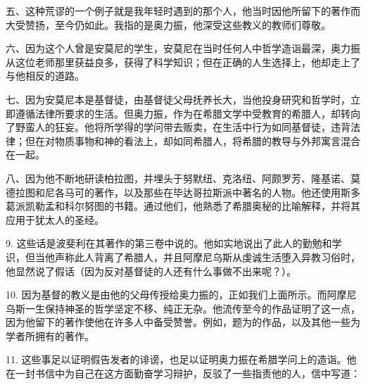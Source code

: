 五、这种荒谬的一个例子就是我年轻时遇到的那个人，他当时因他所留下的著作而大受赞扬，至今仍如此。我指的是奥力振，他深受这些教义的教师们尊敬。\par

六、因为这个人曾是安莫尼的学生，安莫尼在当时任何人中哲学造诣最深，奥力振从这位老师那里获益良多，获得了科学知识；但在正确的人生选择上，他却走上了与他相反的道路。\par

七、因为安莫尼本是基督徒，由基督徒父母抚养长大，当他投身研究和哲学时，立即遵循法律所要求的生活。但奥力振，作为在希腊文学中受教育的希腊人，却转向了野蛮人的狂妄。他将所学得的学问带去贩卖，在生活中行为如同基督徒，违背法律；但在对物质事物和神的看法上，却如同希腊人，将希腊的教导与外邦寓言混合在一起。\par

八、因为他不断地研读柏拉图，并埋头于努默纽、克洛纽、阿颇罗芳、隆基诺、莫德拉图和尼各马可的著作，以及那些在毕达哥拉斯派中著名的人物。他还使用斯多葛派凯勒孟和科尔努图的书籍。通过他们，他熟悉了希腊奥秘的比喻解释，并将其应用于犹太人的圣经。\par

9. 这些话是波斐利在其著作的第三卷中说的。他如实地说出了此人的勤勉和学识，但当他声称此人背离了希腊人，并且阿摩尼乌斯从虔诚生活堕入异教习俗时，他显然说了假话（因为反对基督徒的人还有什么事做不出来呢？）。\par

10. 因为基督的教义是由他的父母传授给奥力振的，正如我们上面所示。而阿摩尼乌斯一生保持神圣的哲学坚定不移、纯正无杂。他流传至今的作品证明了这一点，因为他留下的著作使他在许多人中备受赞誉。例如，题为的作品，以及其他一些为学者所拥有的著作。\par

11. 这些事足以证明假告发者的诽谤，也足以证明奥力振在希腊学问上的造诣。他在一封书信中为自己在这方面勤奋学习辩护，反驳了一些指责他的人，信中写道：\par

\par

\par

